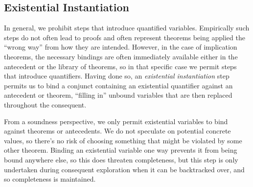 	\subsection{Existential Instantiation\label{sec:existentialInstantiation}}
In general, we prohibit steps that introduce quantified variables.  Empirically such steps do not often lead to proofs and often represent theorems being applied the ``wrong way'' from how they are intended.  However, in the case of implication theorems, the necessary bindings are often immediately available either in the antecedent or the library of theorems, so in that specific case we permit steps that introduce quantifiers.  Having done so, an \emph{existential instantiation} step permits us to bind a conjunct containing an existential quantifier against an antecedent or theorem, ``filling in'' unbound variables that are then replaced throughout the consequent.

From a soundness perspective, we only permit existential variables to bind against theorems or antecedents.  We do not speculate on potential concrete values, so there's no risk of choosing something that might be violated by some other theorem.  Binding an existential variable one way prevents it from being bound anywhere else, so this does threaten completeness, but this step is only undertaken during consequent exploration when it can be backtracked over, and so completeness is maintained.
